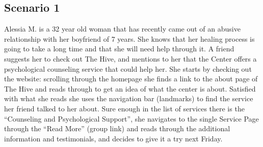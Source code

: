\subsection{Scenario 1}
Alessia M. is a 32 year old woman that has recently came out of an abusive relationship with her boyfriend of 7 years.
She knows that her healing process is going to take a long time and that she will need help through it.
A friend suggests her to check out The Hive, and mentions to her that the Center offers a psychological counseling service
that could help her. She starts by checking out the website: scrolling through the homepage she finds a link to the about page
of The Hive and reads through to get an idea of what the center is about. Satisfied with what she reads she uses the navigation
bar (landmarks) to find the service her friend talked to her about. Sure enough in the list of services there is the “Counseling
and Psychological Support”, she navigates to the single Service Page through the “Read More” (group link) and reads through the
additional information and testimonials, and decides to give it a try next Friday.

